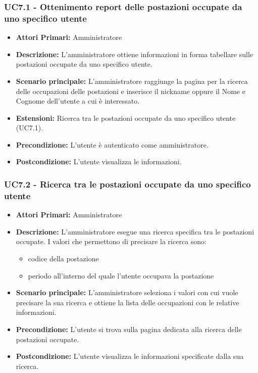 \subsubsection{ UC7.1 - Ottenimento report delle postazioni occupate da uno specifico utente}
\begin{itemize}
           	\item\textbf{Attori Primari:} 
           	Amministratore
           	\item\textbf{Descrizione:} 
           	L'amministratore ottiene informazioni in forma tabellare sulle postazioni occupate da uno specifico utente.
           	\item\textbf{Scenario principale:} 
           	L'amministratore raggiunge la pagina per la ricerca delle occupazioni delle postazioni e inserisce il nickname oppure il Nome e Cognome dell'utente a cui è interessato.
           	\item\textbf{Estensioni:}
           	Ricerca tra le postazioni occupate da uno specifico utente (UC7.1).
           	\item\textbf{Precondizione:} 
           	L'utente è autenticato come amministratore.
           	\item\textbf{Postcondizione:}
           	L'utente visualizza le informazioni.
\end{itemize}


\subsubsection{ UC7.2 - Ricerca tra le postazioni occupate da uno specifico utente}
\begin{itemize}
	\item\textbf{Attori Primari:} 
	Amministratore
	\item\textbf{Descrizione:} 
	L'amministratore esegue una ricerca specifica tra le postazioni occupate.
	I valori che permettono di precisare la ricerca sono:
	\begin{itemize}
		\item codice della postazione
		\item periodo all'interno del quale l'utente occupava la postazione
	\end{itemize}
	\item\textbf{Scenario principale:} 
	L'amministratore seleziona i valori con cui vuole precisare la sua ricerca e ottiene la lista delle occupazioni con le relative informazioni.
	\item\textbf{Precondizione:} 
	L'utente si trova sulla pagina dedicata alla ricerca delle postazioni occupate.
	\item\textbf{Postcondizione:}
	L'utente visualizza le informazioni specificate dalla sua ricerca.
\end{itemize}

